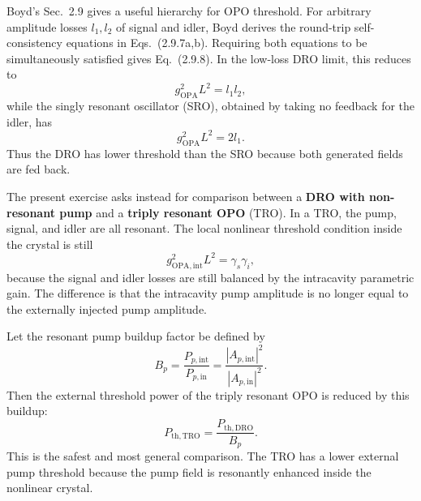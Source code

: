 \begin{resolucao}[Solution]
    Boyd's Sec.~2.9 gives a useful hierarchy for OPO threshold. For arbitrary amplitude losses $l_1,l_2$ of signal and idler, Boyd derives the round-trip self-consistency equations in Eqs.~(2.9.7a,b). Requiring both equations to be simultaneously satisfied gives Eq.~(2.9.8). In the low-loss DRO limit, this reduces to
    \begin{equation}
        g_{\mathrm{OPA}}^2L^2=l_1l_2,
        \tag{Boyd Eq.~2.9.9}
    \end{equation}
    while the singly resonant oscillator (SRO), obtained by taking no feedback for the idler, has
    \begin{equation}
        g_{\mathrm{OPA}}^2L^2=2l_1.
        \tag{Boyd Eq.~2.9.10}
    \end{equation}
    Thus the DRO has lower threshold than the SRO because both generated fields are fed back.

    The present exercise asks instead for comparison between a \textbf{DRO with non-resonant pump} and a \textbf{triply resonant OPO} (TRO). In a TRO, the pump, signal, and idler are all resonant. The local nonlinear threshold condition inside the crystal is still
    \begin{equation}
        g_{\mathrm{OPA,int}}^2L^2
        =
        \gamma_s\gamma_i,
        \label{eq:internal_threshold_same}
    \end{equation}
    because the signal and idler losses are still balanced by the intracavity parametric gain. The difference is that the intracavity pump amplitude is no longer equal to the externally injected pump amplitude.

    Let the resonant pump buildup factor be defined by
    \begin{equation}
        B_p
        =
        \frac{
            P_{p,\mathrm{int}}
        }{
            P_{p,\mathrm{in}}
        }
        =
        \frac{
            |A_{p,\mathrm{int}}|^2
        }{
            |A_{p,\mathrm{in}}|^2
        }.
        \label{eq:pump_buildup_definition}
    \end{equation}
    Then the external threshold power of the triply resonant OPO is reduced by this buildup:
    \begin{equation}
        \boxed{
        P_{\mathrm{th,TRO}}
        =
        \frac{
            P_{\mathrm{th,DRO}}
        }{
            B_p
        }
        }.
        \label{eq:tro_threshold_general}
    \end{equation}
    This is the safest and most general comparison. The TRO has a lower external pump threshold because the pump field is resonantly enhanced inside the nonlinear crystal.


\end{resolucao}
